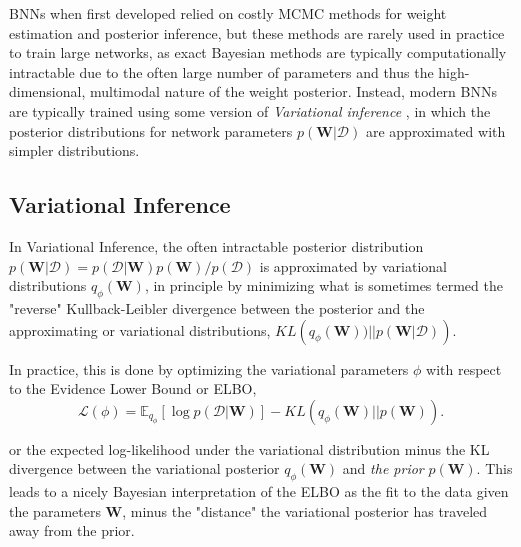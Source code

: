 



BNNs when first developed relied on costly MCMC methods for weight estimation and posterior inference, but these methods are rarely used in practice to train large networks, as exact Bayesian methods are typically computationally intractable due to the often large number of parameters and thus the high-dimensional, multimodal nature of the weight posterior.  
Instead, modern BNNs are typically trained using some version of \emph{Variational inference} \citep{blei_variational_2017}, in which the posterior distributions for network parameters $p(\mathbf{W} | \mathcal{D})$  are approximated with simpler distributions.



\subsection{Variational Inference}
\label{subsec:vi}

In Variational Inference, the often intractable posterior distribution $p(\mathbf{W}|\mathcal{D}) = p(\mathcal{D} | \mathbf{W}) p(\mathbf{W})  /  p(\mathcal{D})$ is approximated by variational distributions $q_\phi(\mathbf{W})$, in principle by minimizing 
what is sometimes termed the "reverse" Kullback-Leibler divergence 
between the posterior and the approximating or variational distributions, 
$KL \left( q_\phi(\mathbf{W})) || p(\mathbf{W}|\mathcal{D}) \right)$. 

In practice, this is done by optimizing the variational parameters $\phi$ with respect to the Evidence Lower Bound or ELBO, 
\begin{equation}
    \mathcal{L}(\phi) = 
      \mathbb{E}_{q_\phi} \left[ \log p(\mathcal{D}|\mathbf{W}) \right] 
      - KL \left( q_\phi(\mathbf{W})||p(\mathbf{W}) \right).
    \label{eq:ELBO}
\end{equation}

or the expected log-likelihood under the variational distribution minus the KL divergence between the variational posterior $q_\phi(\mathbf{W})$ and \textit{the prior} $p(\mathbf{W})$.  This leads to a nicely Bayesian interpretation of the ELBO as the fit to the data given the parameters $\mathbf{W}$, minus the "distance" the variational posterior has traveled away from the prior.

